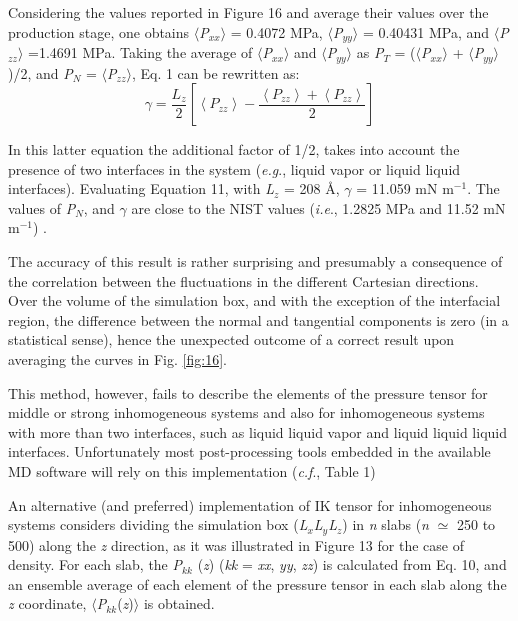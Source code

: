 \documentclass[9pt,bestpractices]{livecoms}
\begin{document}
Considering the values reported in Figure 16 and average their values over the production stage, one obtains ${\langle}$\textit{P}$_{xx}$${\rangle}$ = 0.4072 MPa, ${\langle}$\textit{P}$_{yy}$${\rangle}$  = 0.40431 MPa, and ${\langle}$\textit{P}$_{zz}$${\rangle}$ =1.4691 MPa. Taking the average of ${\langle}$\textit{P}$_{xx}$${\rangle}$ and  ${\langle}$\textit{P}$_{yy}$${\rangle}$ as \textit{P}$_{T}$ = (${\langle}$\textit{P}$_{xx}$${\rangle}$ + ${\langle}$\textit{P}$_{yy}$${\rangle}$)/2, and \textit{P}$_{N}$ = ${\langle}$\textit{P}$_{zz}$${\rangle}$, Eq. 1 can be rewritten as:
\begin{equation}
\gamma=\frac{L_{z}}{2}\left[\left\langle P_{zz}\right\rangle -\frac{\left\langle P_{zz}\right\rangle +\left\langle P_{zz}\right\rangle }{2}\right]
\end{equation}

In this latter equation the additional factor of 1/2, takes into account the
presence of  two interfaces in the system (\textit{e.g}., liquid \textendash{}
vapor or liquid \textendash{} liquid interfaces). Evaluating Equation 11, with
\textit{L}$_{z}$ = 208 \AA{}, ${\gamma}$ = 11.059 mN m$^{-1}$. The values of
\textit{P}$_{N}$, and ${\gamma}$ are close to the NIST values (\textit{i.e}.,
1.2825 MPa and 11.52 mN m$^{-1}$) \citep{lemmon2013}.

The accuracy of this result
is rather surprising and presumably a consequence of the correlation between the
fluctuations in the different Cartesian directions. Over the volume of the simulation
box, and with the exception of the interfacial region, the difference between the
normal and tangential components is zero (in a statistical sense), hence the unexpected
outcome of a correct result upon averaging the curves in Fig. \ref{fig:16}.

This method, however, fails to describe the elements of the pressure
tensor for middle or strong inhomogeneous systems and also for inhomogeneous
systems with more than two interfaces, such as liquid \textendash{} liquid
\textendash{} vapor and liquid \textendash{} liquid \textendash{} liquid
interfaces. Unfortunately most post-processing tools embedded in the available MD software
will rely on this implementation (\textit{c.f}., Table 1)

An alternative (and preferred) implementation of IK tensor for inhomogeneous
systems considers dividing the simulation box
(\textit{L}$_{x}$\textit{L}$_{y}$\textit{L}$_{z}$) in \textit{n} slabs
(\textit{n} ${\simeq}$ 250 to 500) along the \textit{z} direction, as it was
illustrated in Figure 13 for the case of density. For each slab, the
\textit{P}$_{kk}$ (\textit{z}) (\textit{kk} = \textit{xx}, \textit{yy},
\textit{zz}) is calculated from Eq. 10, and an ensemble average of each element
of the pressure tensor in each slab along the \textit{z} coordinate,
${\langle}$\textit{P}$_{kk}$(\textit{z})${\rangle}$ is obtained. 
\end{document}
